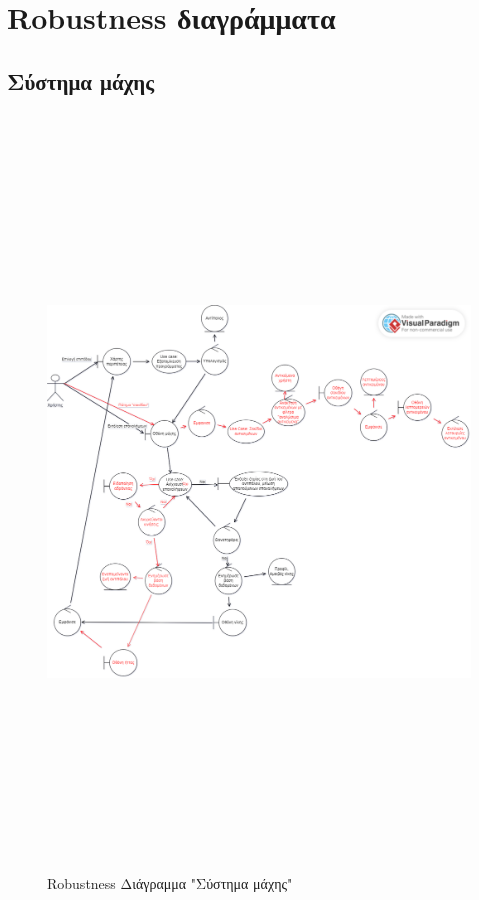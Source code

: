 \section{Robustness διαγράμματα}

\subsection{Σύστημα μάχης}

\begin{figure}[!htb]
  \begin{center}
    \includegraphics[width=18cm,height=20cm]{robust_battle_system.png}
    \caption{Robustness Διάγραμμα "Σύστημα μάχης"}
    \label{}
    \end{center}
\end{figure}
\newpage

